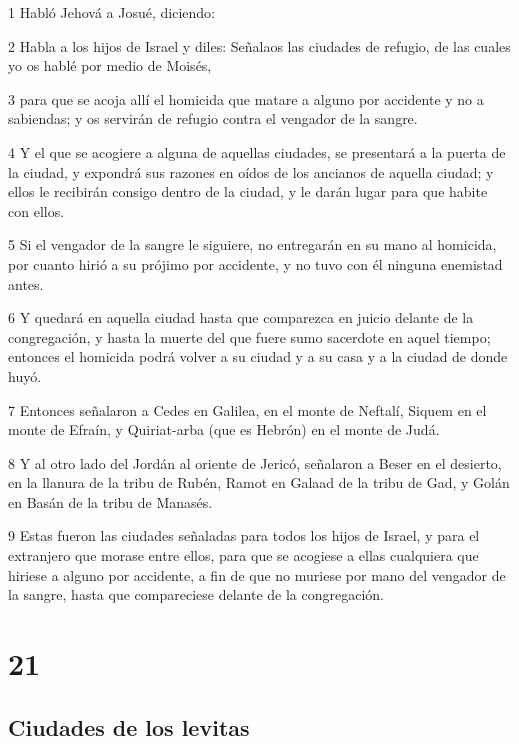 \par 1 Habló Jehová a Josué, diciendo:
\par 2 Habla a los hijos de Israel y diles: Señalaos las ciudades de refugio, de las cuales yo os hablé por medio de Moisés, 
\par 3 para que se acoja allí el homicida que matare a alguno por accidente y no a sabiendas; y os servirán de refugio contra el vengador de la sangre.
\par 4 Y el que se acogiere a alguna de aquellas ciudades, se presentará a la puerta de la ciudad, y expondrá sus razones en oídos de los ancianos de aquella ciudad; y ellos le recibirán consigo dentro de la ciudad, y le darán lugar para que habite con ellos.
\par 5 Si el vengador de la sangre le siguiere, no entregarán en su mano al homicida, por cuanto hirió a su prójimo por accidente, y no tuvo con él ninguna enemistad antes.
\par 6 Y quedará en aquella ciudad hasta que comparezca en juicio delante de la congregación, y hasta la muerte del que fuere sumo sacerdote en aquel tiempo; entonces el homicida podrá volver a su ciudad y a su casa y a la ciudad de donde huyó.
\par 7 Entonces señalaron a Cedes en Galilea, en el monte de Neftalí, Siquem en el monte de Efraín, y Quiriat-arba (que es Hebrón) en el monte de Judá.
\par 8 Y al otro lado del Jordán al oriente de Jericó, señalaron a Beser en el desierto, en la llanura de la tribu de Rubén, Ramot en Galaad de la tribu de Gad, y Golán en Basán de la tribu de Manasés.
\par 9 Estas fueron las ciudades señaladas para todos los hijos de Israel, y para el extranjero que morase entre ellos, para que se acogiese a ellas cualquiera que hiriese a alguno por accidente, a fin de que no muriese por mano del vengador de la sangre, hasta que compareciese delante de la congregación.

\chapter{21}

\section*{Ciudades de los levitas }

